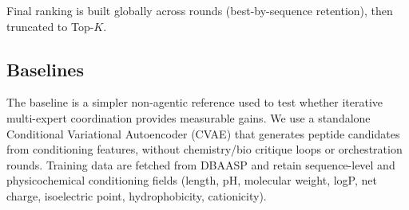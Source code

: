 Final ranking is built globally across rounds (best-by-sequence retention), then truncated to Top-$K$.

\subsection{Baselines}\label{subsec:baselines}
The baseline is a simpler non-agentic reference used to test whether iterative multi-expert coordination provides measurable gains. We use a standalone Conditional Variational Autoencoder (CVAE) that generates peptide candidates from conditioning features, without chemistry/bio critique loops or orchestration rounds. Training data are fetched from DBAASP and retain sequence-level and physicochemical conditioning fields (length, pH, molecular weight, logP, net charge, isoelectric point, hydrophobicity, cationicity).


